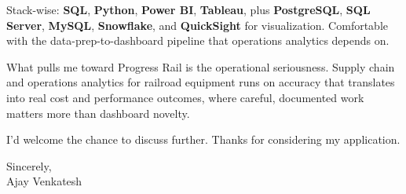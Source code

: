 \documentclass[letterpaper,11pt]{article}
\begin{document}
Stack-wise: \textbf{SQL}, \textbf{Python}, \textbf{Power BI}, \textbf{Tableau}, plus \textbf{PostgreSQL}, \textbf{SQL Server}, \textbf{MySQL}, \textbf{Snowflake}, and \textbf{QuickSight} for visualization. Comfortable with the data-prep-to-dashboard pipeline that operations analytics depends on.

What pulls me toward Progress Rail is the operational seriousness. Supply chain and operations analytics for railroad equipment runs on accuracy that translates into real cost and performance outcomes, where careful, documented work matters more than dashboard novelty.

I'd welcome the chance to discuss further. Thanks for considering my application.

\vspace{12pt}
Sincerely, \\
Ajay Venkatesh
\end{document}
